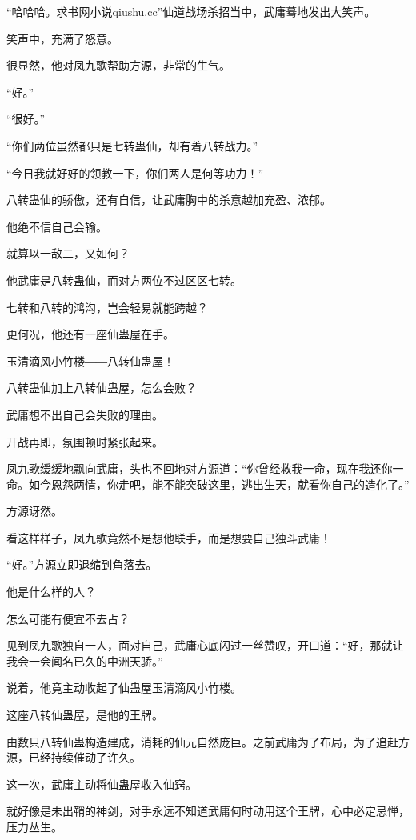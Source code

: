 
\begin{this_body}

“哈哈哈。求书网小说qiushu.cc”仙道战场杀招当中，武庸蓦地发出大笑声。

笑声中，充满了怒意。

很显然，他对凤九歌帮助方源，非常的生气。

“好。”

“很好。”

“你们两位虽然都只是七转蛊仙，却有着八转战力。”

“今日我就好好的领教一下，你们两人是何等功力！”

八转蛊仙的骄傲，还有自信，让武庸胸中的杀意越加充盈、浓郁。

他绝不信自己会输。

就算以一敌二，又如何？

他武庸是八转蛊仙，而对方两位不过区区七转。

七转和八转的鸿沟，岂会轻易就能跨越？

更何况，他还有一座仙蛊屋在手。

玉清滴风小竹楼――八转仙蛊屋！

八转蛊仙加上八转仙蛊屋，怎么会败？

武庸想不出自己会失败的理由。

开战再即，氛围顿时紧张起来。

凤九歌缓缓地飘向武庸，头也不回地对方源道：“你曾经救我一命，现在我还你一命。如今恩怨两情，你走吧，能不能突破这里，逃出生天，就看你自己的造化了。”

方源讶然。

看这样样子，凤九歌竟然不是想他联手，而是想要自己独斗武庸！

“好。”方源立即退缩到角落去。

他是什么样的人？

怎么可能有便宜不去占？

见到凤九歌独自一人，面对自己，武庸心底闪过一丝赞叹，开口道：“好，那就让我会一会闻名已久的中洲天骄。”

说着，他竟主动收起了仙蛊屋玉清滴风小竹楼。

这座八转仙蛊屋，是他的王牌。

由数只八转仙蛊构造建成，消耗的仙元自然庞巨。之前武庸为了布局，为了追赶方源，已经持续催动了许久。

这一次，武庸主动将仙蛊屋收入仙窍。

就好像是未出鞘的神剑，对手永远不知道武庸何时动用这个王牌，心中必定忌惮，压力丛生。


\end{this_body}
